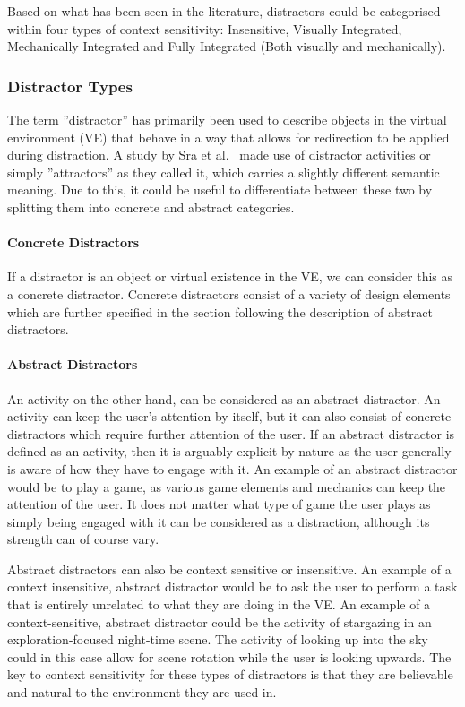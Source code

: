 Based on what has been seen in the literature, distractors could be categorised within four types of context sensitivity: Insensitive, Visually Integrated, Mechanically Integrated and Fully Integrated (Both visually and mechanically).

\subsubsection{Distractor Types}
The term ''distractor'' has primarily been used to describe objects in the virtual environment (VE) that behave in a way that allows for redirection to be applied during distraction. A study by Sra et al.~\cite{sra2018vmotion} made use of distractor activities or simply ''attractors'' as they called it, which carries a slightly different semantic meaning. Due to this, it could be useful to differentiate between these two by splitting them into concrete and abstract categories.

\paragraph{Concrete Distractors}
If a distractor is an object or virtual existence in the VE, we can consider this as a concrete distractor. Concrete distractors consist of a variety of design elements which are further specified in the section following the description of abstract distractors. 

\paragraph{Abstract Distractors}
An activity on the other hand, can be considered as an abstract distractor. An activity can keep the user's attention by itself, but it can also consist of concrete distractors which require further attention of the user. If an abstract distractor is defined as an activity, then it is arguably explicit by nature as the user generally is aware of how they have to engage with it. An example of an abstract distractor would be to play a game, as various game elements and mechanics can keep the attention of the user. It does not matter what type of game the user plays as simply being engaged with it can be considered as a distraction, although its strength can of course vary. 

Abstract distractors can also be context sensitive or insensitive. An example of a context insensitive, abstract distractor would be to ask the user to perform a task that is entirely unrelated to what they are doing in the VE. An example of a context-sensitive, abstract distractor could be the activity of stargazing in an exploration-focused night-time scene. The activity of looking up into the sky could in this case allow for scene rotation while the user is looking upwards. The key to context sensitivity for these types of distractors is that they are believable and natural to the environment they are used in. 

